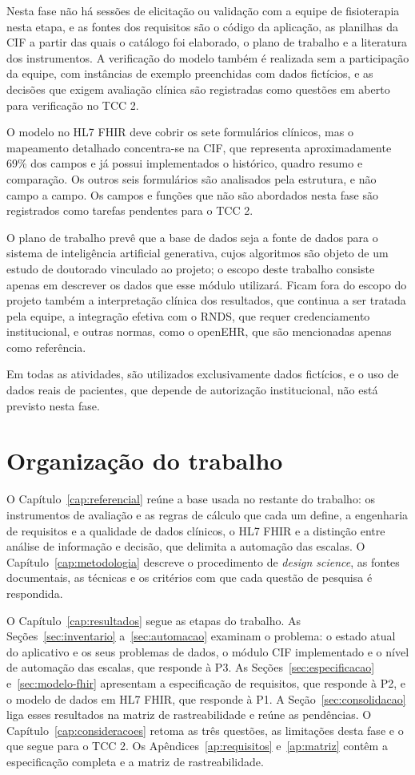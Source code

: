 Nesta fase não há sessões de elicitação ou validação com a equipe de fisioterapia nesta etapa, e as fontes dos requisitos 
são o código da aplicação, as planilhas da CIF a partir das quais o catálogo foi elaborado, o plano de trabalho e
a literatura dos instrumentos. A verificação do modelo também é realizada sem a participação da equipe, 
com instâncias de exemplo preenchidas com dados fictícios, e as decisões que exigem avaliação clínica são 
registradas como questões em aberto para verificação no TCC 2.

O modelo no HL7 FHIR deve cobrir os sete formulários clínicos, mas o mapeamento detalhado concentra-se na CIF, que
representa aproximadamente 69\% dos campos e já possui implementados o histórico, quadro resumo e comparação. Os outros
seis formulários são analisados pela estrutura, e não campo a campo. Os campos e funções que não são abordados nesta fase são
registrados como tarefas pendentes para o TCC 2.

O plano de trabalho prevê que a base de dados seja a fonte de dados para o sistema de inteligência artificial generativa, cujos
algoritmos são objeto de um estudo de doutorado vinculado ao projeto; o escopo deste trabalho consiste apenas em descrever os dados que esse módulo utilizará. Ficam fora do escopo do projeto também a interpretação clínica dos resultados, que continua a ser tratada pela equipe,
a integração efetiva com o RNDS, que requer credenciamento institucional, e outras normas, como o openEHR, que são mencionadas
apenas como referência.

Em todas as atividades, são utilizados exclusivamente dados fictícios, e o uso de dados reais de pacientes, que depende de
autorização institucional, não está previsto nesta fase.

\section{Organização do trabalho}

O Capítulo~\ref{cap:referencial} reúne a base usada no restante do trabalho: os instrumentos de
avaliação e as regras de cálculo que cada um define, a engenharia de requisitos e a qualidade de dados
clínicos, o HL7 FHIR e a distinção entre análise de informação e decisão, que delimita a automação das
escalas. O Capítulo~\ref{cap:metodologia} descreve o procedimento de \textit{design science}, as fontes
documentais, as técnicas e os critérios com que cada questão de pesquisa é respondida.

O Capítulo~\ref{cap:resultados} segue as etapas do trabalho. As Seções~\ref{sec:inventario}
a~\ref{sec:automacao} examinam o problema: o estado atual do aplicativo e os seus problemas de dados, o
módulo CIF implementado e o nível de automação das escalas, que responde à P3. As
Seções~\ref{sec:especificacao} e~\ref{sec:modelo-fhir} apresentam a especificação de requisitos, que
responde à P2, e o modelo de dados em HL7 FHIR, que responde à P1. A Seção~\ref{sec:consolidacao} liga
esses resultados na matriz de rastreabilidade e reúne as pendências. O Capítulo~\ref{cap:consideracoes}
retoma as três questões, as limitações desta fase e o que segue para o TCC 2. Os
Apêndices~\ref{ap:requisitos} e~\ref{ap:matriz} contêm a especificação completa e a matriz de
rastreabilidade.
